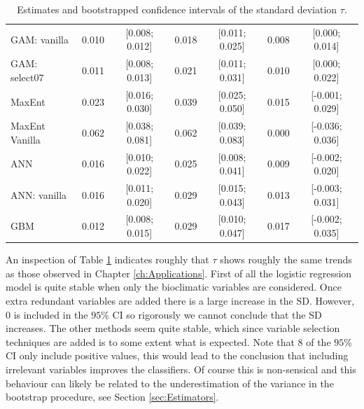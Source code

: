 \begin{table}[!htb]
{\begin{tabular}{lcccccc}
GAM: vanilla                      & 0.010 &  [0.008; 0.012] & 0.018  & [0.011; 0.025] & 0.008  &  [0.000; 0.014]   \\ 
GAM: select07                     & 0.011 &  [0.008; 0.013] & 0.021  & [0.011; 0.031] & 0.010  &  [0.000; 0.022]   \\ 
MaxEnt                            & 0.023 &  [0.016; 0.030] & 0.039  & [0.025; 0.050] & 0.015  &  [-0.001; 0.029]   \\
MaxEnt Vanilla                    & 0.062 &  [0.038; 0.081] & 0.062  & [0.039; 0.083] & 0.000  &  [-0.036; 0.036]   \\
ANN                               & 0.016 &  [0.010; 0.022] & 0.025  & [0.008; 0.041] & 0.009  &  [-0.002; 0.020]   \\
ANN: vanilla                      & 0.016 &  [0.011; 0.020] & 0.029  & [0.015; 0.043] & 0.013  &  [-0.003; 0.031]   \\
GBM                               & 0.012 &  [0.008; 0.015] & 0.029  & [0.010; 0.047] & 0.017  &  [-0.002; 0.035]   \\
\bottomrule
\end{tabular}}
\caption{\label{tab:SDSimulation}Estimates and bootstrapped confidence intervals of the standard deviation $\tau$.}
\end{table}

An inspection of Table \ref{tab:SDSimulation} indicates roughly that $\tau$ shows roughly the same trends as those observed in Chapter \ref{ch:Applications}. First of all the logistic regression model is quite stable when only the bioclimatic variables are considered. Once extra redundant variables are added there is a large increase in the SD. However, $0$ is included in the $95$\% CI so rigorously we cannot conclude that the SD increases. The other methods seem quite stable, which since variable selection techniques are added is to some extent what is expected. Note that $8$ of the $95$\% CI only include positive values, this would lead to the conclusion that including irrelevant variables improves the classifiers. Of course this is non-sensical and this behaviour can likely be related to the underestimation of the variance in the bootstrap procedure, see Section \ref{sec:Estimators}. \\


